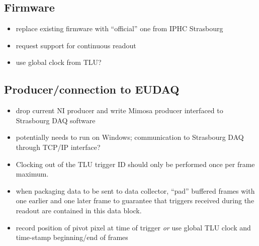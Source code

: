 \documentclass[paper=a4, fontsize=11pt]{scrartcl}	%
\numberwithin{equation}{section}		%
\numberwithin{figure}{section}			%
\numberwithin{table}{section}				%
\begin{document}
\subsection{Firmware}
\label{sec:firmware}
\begin{itemize}
\item replace existing firmware with ``official'' one from IPHC Strasbourg
\item request support for continuous readout
\item use global clock from TLU?
\end{itemize}

\subsection{Producer/connection to EUDAQ}
\label{sec:prod-eudaq}
\begin{itemize}
\item drop current NI producer and write Mimosa producer interfaced
  to Strasbourg DAQ software
\item potentially needs to run on Windows; communication to Strasbourg
  DAQ through TCP/IP interface?
\item Clocking out of the TLU trigger ID should only be performed once
  per frame maximum.
\item when packaging data to be sent to data collector, ``pad''
  buffered frames with one earlier and one later frame to guarantee
  that triggers received during the readout are contained in this data
  block.
\item record position of pivot pixel at time of trigger \emph{or} use
  global TLU clock and time-stamp beginning/end of frames
\end{itemize}


\end{document}

